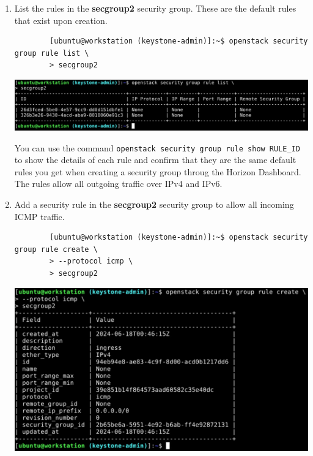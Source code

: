 \documentclass[letterpaper, 12pt]{article}
\begin{document}
\begin{enumerate}
    \item List the rules in the \textbf{secgroup2} security group. These are the default rules that exist upon
    creation.
    \begin{lstlisting}
        [ubuntu@workstation (keystone-admin)]:~$ openstack security group rule list \
        > secgroup2
    \end{lstlisting}

    \begin{center}
        \includegraphics[width=\linewidth]{images/part5/step13.png}
    \end{center}

    \begin{tipbox}
        You can use the command \texttt{openstack security group rule show RULE\_ID} to show the details of each rule
        and confirm that they are the same default rules you get when creating a security group throug the Horizon
        Dashboard. The rules allow all outgoing traffic over IPv4 and IPv6.
    \end{tipbox}

    \item Add a security rule in the \textbf{secgroup2} security group to allow all incoming ICMP traffic. 
    \begin{lstlisting}
        [ubuntu@workstation (keystone-admin)]:~$ openstack security group rule create \
        > --protocol icmp \
        > secgroup2
    \end{lstlisting}

    \begin{center}
        \includegraphics[width=\linewidth]{images/part5/step14.png}
    \end{center}


\end{enumerate}
\end{document}
